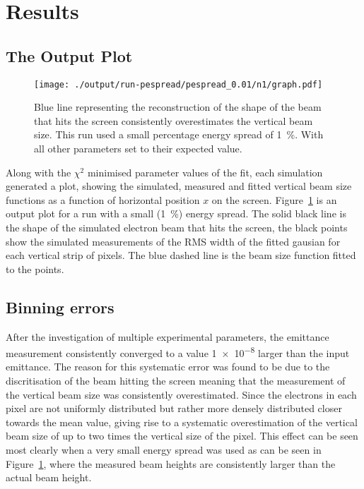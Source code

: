 
\section{Results}
\label{sec:results}

\subsection{The Output Plot}
\label{sub:output}

\begin{figure}[tb]
	\centering
	\texttt{[image: ./output/run-pespread/pespread\_0.01/n1/graph.pdf]}
	\caption{
		Blue line representing the reconstruction of the shape of the beam that
		hits the screen consistently overestimates the vertical beam size. This
		run used a small percentage energy spread of \SI{1}{\percent}. With all
		other parameters set to their expected value.
	}
	\label{fig:yoverestimate}
\end{figure}

Along with the \(\chi^2\) minimised parameter values of the fit, each simulation
generated a plot, showing the simulated, measured and fitted vertical beam size
functions as a function of horizontal position \(x\) on the screen.
Figure~\ref{fig:yoverestimate} is an output plot for a run with a small
(\SI{1}{\percent}) energy spread. The solid black line is the shape of the
simulated electron beam that hits the screen, the black points show the
simulated measurements of the RMS width of the fitted gausian for each vertical
strip of pixels. The blue dashed line is the beam size function fitted to the
points.

\subsection{Binning errors}

After the investigation of multiple experimental parameters, the emittance
measurement consistently converged to a value \num{1e-8} larger than the input
emittance. The reason for this systematic error was found to be due to the
discritisation of the beam hitting the screen meaning that the measurement of
the vertical beam size was consistently overestimated. Since the electrons in
each pixel are not uniformly distributed but rather more densely distributed
closer towards the mean value, giving rise to a systematic overestimation of the
vertical beam size of up to two times the vertical size of the pixel. This
effect can be seen most clearly when a very small energy spread was used as can
be seen in Figure~\ref{fig:yoverestimate}, where the measured beam heights are
consistently larger than the actual beam height.

